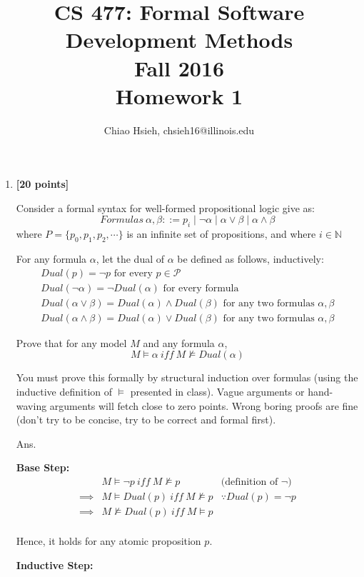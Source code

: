 \documentclass{article}
\title{\Large\bfseries CS 477: Formal Software Development Methods \\
Fall 2016 \\
Homework 1}
\author{Chiao Hsieh, chsieh16@illinois.edu}
\begin{document}
\maketitle

\begin{enumerate}
\item \textbf{[20 points]}

Consider a formal syntax for well-formed propositional logic give as:
\[
    Formulas\ \alpha, \beta ::= p_i \mid \neg\alpha \mid \alpha\lor\beta \mid \alpha\land\beta
\]
where \(P = \{p_0, p_1, p_2, \cdots\}\) is an infinite set of propositions, and where \(i\in \mathbb{N}\)

For any formula \(\alpha\), let the dual of \(\alpha\)
be defined as follows, inductively:
\[
\begin{array}{l}
Dual(p) = \neg p \text{ for every } p \in \mathcal{P} \\
Dual(\neg\alpha) = \neg Dual(\alpha) \text{ for every formula} \\
Dual(\alpha\lor\beta) = Dual(\alpha) \land Dual(\beta) \text{ for any two formulas }\alpha, \beta \\
Dual(\alpha\land\beta) = Dual(\alpha) \lor Dual(\beta) \text{ for any two formulas }\alpha, \beta
\end{array}
\]

Prove that for any model \(M\) and any formula \(\alpha\),
\[
  M \models \alpha\ \mathit{iff}\ M \not\models Dual(\alpha)
\]

You must prove this formally by structural induction over formulas
(using the inductive definition of \(\models\)  presented in class).
Vague arguments or hand-waving arguments will fetch close to zero points.
Wrong boring proofs are fine
(don't try to be concise, try to be correct and formal first).

\medskip
Ans.
\medskip

\textbf{Base Step:}
\[
\begin{array}{rll}
	         & M \models \neg p \ \mathit{iff}\ M \not\models p & \text{(definition of \(\neg\))}\\
	\implies & M \models Dual(p)\ \mathit{iff}\ M \not\models p & \because Dual(p) = \neg p\\
	\implies & M \not\models Dual(p)\ \mathit{iff}\ M \models p\\
\end{array}
\]

Hence, it holds for any atomic proposition \(p\).

\textbf{Inductive Step:}


\end{enumerate}
\end{document}
